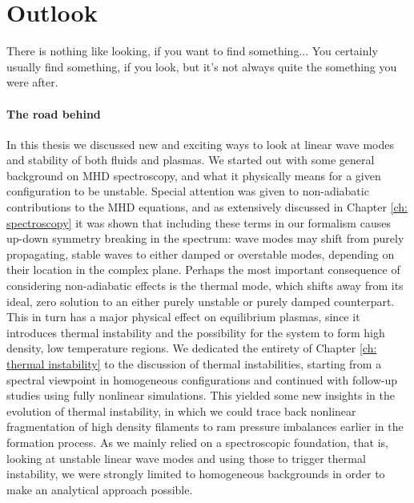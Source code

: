 \chapter{Outlook} \label{ch: conclusions}

\begin{chapterquote}
  There is nothing like looking, if you want to find something... You certainly usually find something,
  if you look, but it's not always quite the something you were after.
\end{chapterquote}

\subsubsection{The road behind}
In this thesis we discussed new and exciting ways to look at linear wave modes and stability of both fluids and plasmas.
We started out with some general background on MHD spectroscopy, and what it physically means for a given configuration to be unstable. Special attention was given to non-adiabatic contributions to the MHD equations, and as extensively discussed in Chapter \ref{ch: spectroscopy} it was shown that including these terms in our formalism causes up-down symmetry breaking in the spectrum: wave modes may shift from purely propagating, stable waves to either damped or overstable modes, depending on their location in the complex plane. Perhaps the most important consequence of considering non-adiabatic effects is the thermal mode, which shifts away from its ideal, zero solution to an either purely unstable or purely damped counterpart. This in turn has a major physical effect on equilibrium plasmas, since it introduces thermal instability and the possibility for the system to form high density, low temperature regions. We dedicated the entirety of Chapter \ref{ch: thermal instability} to the discussion of thermal instabilities, starting from a spectral viewpoint in homogeneous configurations and continued with follow-up studies using fully nonlinear simulations. This yielded some new insights in the evolution of thermal instability, in which we could trace back nonlinear fragmentation of high density filaments to ram pressure imbalances earlier in the formation process. As we mainly relied on a spectroscopic foundation, that is, looking at unstable linear wave modes and using those to trigger thermal instability, we were strongly limited to homogeneous backgrounds in order to make an analytical approach possible.

